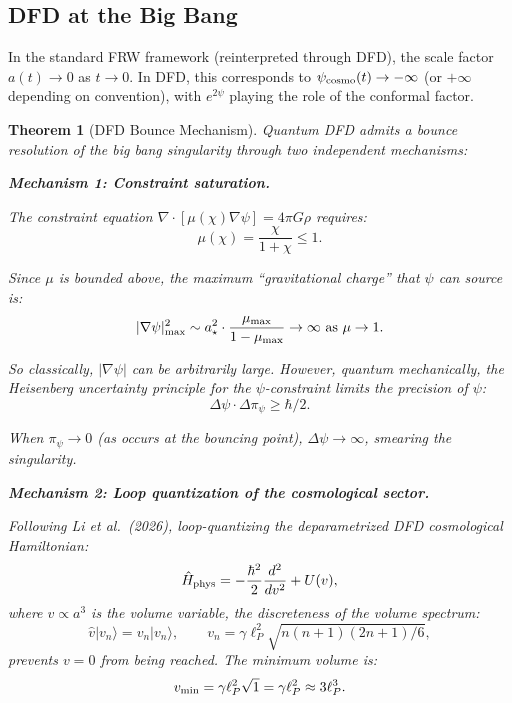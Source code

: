 \documentclass[11pt,a4paper]{article}
\newtheorem{theorem}{Theorem}
\begin{document}
\subsection{DFD at the Big Bang}

In the standard FRW framework (reinterpreted through DFD), the scale factor $a(t) \to 0$ as $t \to 0$. In DFD, this corresponds to $\psi_{\rm cosmo}(t) \to -\infty$ (or $+\infty$ depending on convention), with $e^{2\psi}$ playing the role of the conformal factor.

\begin{theorem}[DFD Bounce Mechanism]
\label{thm:bounce}
Quantum DFD admits a bounce resolution of the big bang singularity through two independent mechanisms:

\textbf{Mechanism 1: Constraint saturation.}

The constraint equation $\nabla\cdot[\mu(\chi)\nabla\psi] = 4\pi G\rho$ requires:
\begin{equation}
\mu(\chi) = \frac{\chi}{1+\chi} \leq 1.
\end{equation}

Since $\mu$ is bounded above, the maximum ``gravitational charge'' that $\psi$ can source is:
\begin{equation}
|\nabla\psi|_{\rm max}^2 \sim a_\star^2\cdot\frac{\mu_{\rm max}}{1 - \mu_{\rm max}} \to \infty \text{ as } \mu \to 1.
\end{equation}

So classically, $|\nabla\psi|$ can be arbitrarily large. However, quantum mechanically, the Heisenberg uncertainty principle for the $\psi$-constraint limits the precision of $\psi$:
\begin{equation}
\Delta\psi\cdot\Delta\pi_\psi \geq \hbar/2.
\end{equation}

When $\pi_\psi \to 0$ (as occurs at the bouncing point), $\Delta\psi \to \infty$, smearing the singularity.

\textbf{Mechanism 2: Loop quantization of the cosmological sector.}

Following Li et al.\ (2026), loop-quantizing the deparametrized DFD cosmological Hamiltonian:
\begin{equation}
\hat{H}_{\rm phys} = -\frac{\hbar^2}{2}\frac{d^2}{d v^2} + U(v),
\end{equation}
where $v \propto a^3$ is the volume variable, the discreteness of the volume spectrum:
\begin{equation}
\hat{v}|v_n\rangle = v_n|v_n\rangle, \qquad v_n = \gamma\ell_P^2\sqrt{n(n+1)(2n+1)/6},
\end{equation}
prevents $v = 0$ from being reached. The minimum volume is:
\begin{equation}
v_{\rm min} = \gamma\ell_P^2\sqrt{1} = \gamma\ell_P^2 \approx 3\ell_P^3.
\end{equation}


\end{theorem}
\end{document}
